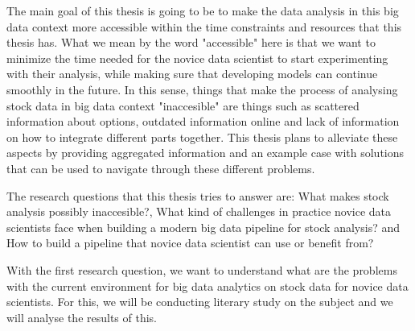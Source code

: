 The main goal of this thesis is going to be to make the data analysis in this big data context more accessible within the time constraints and resources that this thesis has.
What we mean by the word "accessible" here is that we want to minimize the time needed for the novice data scientist to start experimenting with their analysis, while making sure that developing models can continue smoothly in the future.
In this sense, things that make the process of analysing stock data in big data context "inaccesible" are things such as scattered information about options, outdated information online and lack of information on how to integrate different parts together.
This thesis plans to alleviate these aspects by providing aggregated information and an example case with solutions that can be used to navigate through these different problems.



The research questions that this thesis tries to answer are: What makes stock analysis possibly inaccesible?, What kind of challenges in practice novice data scientists face when building a modern big data pipeline for stock analysis? and How to build a pipeline that novice data scientist can use or benefit from?


With the first research question, we want to understand what are the problems with the current environment for big data analytics on stock data for novice data scientists.
For this, we will be conducting literary study on the subject and we will analyse the results of this.

